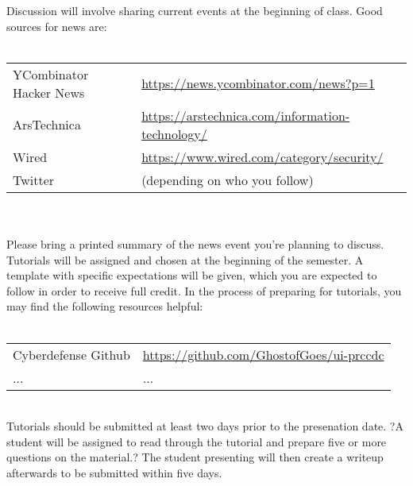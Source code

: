 \documentclass{article}
\begin{document}
\noindent Discussion will involve sharing current events at the beginning of class. Good sources for news are:\\\\
\begin{tabular}{l   l}
YCombinator Hacker News & \url{https://news.ycombinator.com/news?p=1} \\
ArsTechnica & \url{https://arstechnica.com/information-technology/} \\
Wired & \url{https://www.wired.com/category/security/} \\
Twitter & (depending on who you follow)
\end{tabular}\\\\
Please bring a printed summary of the news event you're planning to discuss.\\


\noindent Tutorials will be assigned and chosen at the beginning of the semester. A template with specific expectations will be given, which you are expected to follow in order to receive full credit. In the process of preparing for tutorials, you may find the following resources helpful: \\\\
\begin{tabular}{l  l}
Cyberdefense Github & \url{https://github.com/GhostofGoes/ui-prccdc} \\
... & ...\\
\end{tabular}\\
Tutorials should be submitted at least two days prior to the presenation date. ?A student will be assigned to read through the tutorial and prepare five or more questions on the material.? The student presenting will then create a writeup afterwards to be submitted within five days.
\end{document}
